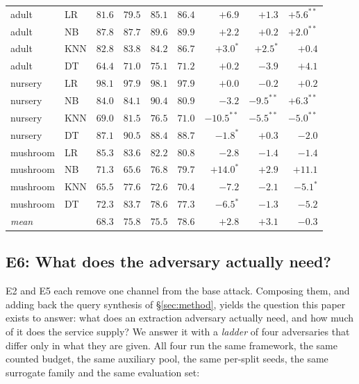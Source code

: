 \documentclass[sigconf,anonymous,review]{acmart}
\begin{document}
\begin{table}[t]
\begin{tabular}{llrrrrrrr}
\addlinespace
adult      & LR   & $81.6$ & $79.5$ & $85.1$ & $86.4$ & $+6.9$ & $+1.3$ & $+5.6^{**}$ \\
adult      & NB   & $87.8$ & $87.7$ & $89.6$ & $89.9$ & $+2.2$ & $+0.2$ & $+2.0^{**}$ \\
adult      & KNN  & $82.8$ & $83.8$ & $84.2$ & $86.7$ & $+3.0^{*}$ & $+2.5^{*}$ & $+0.4$ \\
adult      & DT   & $64.4$ & $71.0$ & $75.1$ & $71.2$ & $+0.2$ & $-3.9$ & $+4.1$ \\
\addlinespace
nursery    & LR   & $98.1$ & $97.9$ & $98.1$ & $97.9$ & $+0.0$ & $-0.2$ & $+0.2$ \\
nursery    & NB   & $84.0$ & $84.1$ & $90.4$ & $80.9$ & $-3.2$ & $-9.5^{**}$ & $+6.3^{**}$ \\
nursery    & KNN  & $69.0$ & $81.5$ & $76.5$ & $71.0$ & $-10.5^{**}$ & $-5.5^{**}$ & $-5.0^{**}$ \\
nursery    & DT   & $87.1$ & $90.5$ & $88.4$ & $88.7$ & $-1.8^{*}$ & $+0.3$ & $-2.0$ \\
\addlinespace
mushroom   & LR   & $85.3$ & $83.6$ & $82.2$ & $80.8$ & $-2.8$ & $-1.4$ & $-1.4$ \\
mushroom   & NB   & $71.3$ & $65.6$ & $76.8$ & $79.7$ & $+14.0^{*}$ & $+2.9$ & $+11.1$ \\
mushroom   & KNN  & $65.5$ & $77.6$ & $72.6$ & $70.4$ & $-7.2$ & $-2.1$ & $-5.1^{*}$ \\
mushroom   & DT   & $72.3$ & $83.7$ & $78.6$ & $77.3$ & $-6.5^{*}$ & $-1.3$ & $-5.2$ \\
\midrule
\multicolumn{2}{l}{\emph{mean}} & $68.3$ & $75.8$ & $75.5$ & $78.6$ & $+2.8$ & $+3.1$ & $-0.3$ \\
\bottomrule
\end{tabular}
\end{table}

\subsection{E6: What does the adversary actually need?}
\label{subsec:ladder}
E2 and E5 each remove one channel from the base attack. Composing them, and adding back the query
synthesis of \S\ref{sec:method}, yields the question this paper exists to answer: what does an
extraction adversary actually need, and how much of it does the service supply? We answer it with a
\emph{ladder} of four adversaries that differ only in what they are given. All four run the same
framework, the same counted budget, the same auxiliary pool, the same per-split seeds, the same
surrogate family and the same evaluation set:
\end{document}
